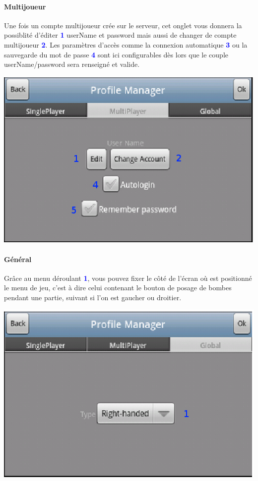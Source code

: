 		\paragraph{Multijoueur\\}
		Une fois un compte multijoueur crée sur le serveur, cet onglet vous donnera la
		possiblité d'éditer \textcolor{blue}{\textbf{1}} userName et password mais
		aussi de changer de compte multijoueur \textcolor{blue}{\textbf{2}}. Les
		paramètres d'accès comme la connexion automatique
		\textcolor{blue}{\textbf{3}} ou la sauvegarde du mot de passe
		\textcolor{blue}{\textbf{4}} sont ici configurables dès lors que le couple
		userName/password sera renseigné et valide.
		
		\begin{center}
				\includegraphics[scale=0.8]{Manuel/Img/6.eps}
		\end{center}
		
		\newpage{}	
		\paragraph{Général\\}
		Grâce au menu déroulant \textcolor{blue}{\textbf{1}}, vous pouvez fixer le
		côté de l'écran où est positionné le menu de jeu, c'est à dire celui contenant
		le bouton de posage de bombes pendant une partie, suivant si l'on est gaucher ou droitier. 
		
		\begin{center}
				\includegraphics[scale=0.8]{Manuel/Img/7.eps}
		\end{center}
			
